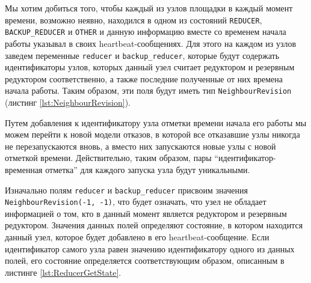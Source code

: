 \documentclass{article}
\theoremstyle{plain}
\theoremstyle{plain}
\theoremstyle{plain}
\theoremstyle{plain}
\theoremstyle{definition}
\theoremstyle{remark}
\theoremstyle{plain}
\begin{document}
Мы хотим добиться того, чтобы каждый из узлов площадки в каждый момент времени, возможно неявно, находился в одном из состояний \texttt{REDUCER}, \texttt{BACKUP\_REDUCER} и \texttt{OTHER} и данную информацию вместе со временем начала работы указывал в своих heartbeat-сообщениях. Для этого на каждом из узлов заведем переменные \texttt{reducer} и \texttt{backup\_reducer}, которые будут содержать идентификаторы узлов, которых данный узел считает редуктором и резервным редуктором соответственно, а также последние полученные от них времена начала работы. Таким образом, эти поля будут иметь тип \texttt{NeighbourRevision} (листинг \ref{lst:NeighbourRevision}).


Путем добавления к идентификатору узла отметки времени начала его работы мы можем перейти к новой модели отказов, в которой все отказавшие узлы никогда не перезапускаются вновь, а вместо них запускаются новые узлы с новой отметкой времени. Действительно, таким образом, пары \enquote{идентификатор-временная отметка} для каждого запуска узла будут уникальными.

Изначально полям \texttt{reducer} и \texttt{backup\_reducer} присвоим значения \texttt{Neigh\-bour\-Re\-vi\-si\-on(-1, -1)}, что будет означать, что узел не обладает информацией о том, кто в данный момент является редуктором и резервным редуктором. Значения данных полей определяют состояние, в котором находится данный узел, которое будет добавлено в его heartbeat-сообщение. Если идентификатор самого узла равен значению идентификатору одного из данных полей, его состояние определяется соответствующим образом, описанным в листинге \ref{lst:ReducerGetState}.

\end{document}
